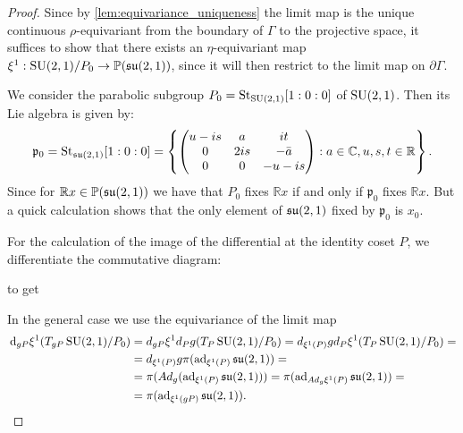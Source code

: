 \documentclass{report}
\begin{document}
\begin{proof}
Since by \cref{lem:equivariance_uniqueness} the limit map is the unique continuous $\rho$-equivariant from the boundary of $\Gamma$ to the projective space, it suffices to show that there exists an $\eta$-equivariant map $\xi^1:\operatorname{{\mathrm{SU}}}(2,1)/P_0 \to \mathbb P(\mathfrak{su}(2,1))$, since it will then restrict to the limit map on $\partial \Gamma$.

We consider the parabolic subgroup $P_0 = \mathrm{St}_{\operatorname{{\mathrm{SU}}}(2,1)} [1:0:0]$ of $\operatorname{{\mathrm{SU}}}(2,1)$.
Then its Lie algebra is given by:
\[
\mathfrak p_0 = \mathrm{St}_{\operatorname{{\mathfrak{su}}}(2,1)}[1:0:0] = \left\{ \begin{pmatrix} u - is & a & i t \\ 0 & 2is & - \bar a \\ 0 & 0 & -u - is \end{pmatrix} : a \in \mathbb C, u,s,t \in \mathbb R \right\}.
\]
Since for $\mathbb R x \in \mathbb P(\operatorname{{\mathfrak{su}}}(2,1))$ we have that $P_0$ fixes $\mathbb R x$ if and only if $\mathfrak p_0$ fixes $\mathbb R x$.
But a quick calculation shows that the only element of $\operatorname{{\mathfrak{su}}}(2,1)$ fixed by $\mathfrak p_0$ is $x_0$.

For the calculation of the image of the differential at the identity coset $P$, we differentiate the commutative diagram:
\begin{center}
    to get
\end{center}


In the general case we use the equivariance of the limit map
\begin{align*}
    \,\mathrm{d}_{gP} \xi^1 (T_{gP} \operatorname{{\mathrm{SU}}}(2,1)/P_0) &=
    d_{gP} \xi^1 d_P g (T_P \operatorname{{\mathrm{SU}}}(2,1)/P_0) =
    d_{\xi^1(P)} g d_P \xi^1 (T_P \operatorname{{\mathrm{SU}}}(2,1)/P_0) =\\
    &= d_{\xi^1(P)} g \pi(\operatorname{ad}_{\xi^1(P)} \operatorname{{\mathfrak{su}}}(2,1)) =\\
    &= \pi(Ad_g(\operatorname{ad}_{\xi^1(P)} \operatorname{{\mathfrak{su}}}(2,1))) = \pi(\operatorname{ad}_{Ad_g \xi^1(P)} \operatorname{{\mathfrak{su}}}(2,1))=\\
    &= \pi(\operatorname{ad}_{\xi^1(gP)} \operatorname{{\mathfrak{su}}}(2,1)).
\end{align*}
\end{proof}
\end{document}
